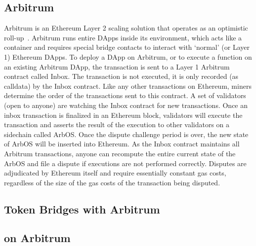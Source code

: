 

\subsection{Arbitrum}

Arbitrum is an Ethereum Layer 2 scaling solution that operates as an optimistic roll-up~\cite{kalodner2018arbitrum}. Arbitrum runs entire DApps inside its environment, which acts like a container and requires special bridge contacts to interact with `normal' (or Layer 1) Ethereum DApps. To deploy a DApp on Arbitrum, or to execute a function on an existing Arbitrum DApp, the transaction is sent to a Layer 1 Arbitrum contract called Inbox. The transaction is not executed, it is only recorded (as calldata) by the Inbox contract. Like any other transactions on Ethereum, miners determine the order of the transactions sent to this contract. A set of validators (open to anyone) are watching the Inbox contract for new transactions. Once an inbox transaction is finalized in an Ethereum block, validators will execute the transaction and asserts the result of the execution to other validators on a sidechain called ArbOS. Once the dispute challenge period is over, the new state of ArbOS will be inserted into Ethereum. As the Inbox contract maintains all Arbitrum transactions, anyone can recompute the entire current state of the ArbOS and file a dispute if executions are not performed correctly. Disputes are adjudicated by Ethereum itself and require essentially constant gas costs, regardless of the size of the gas costs of the transaction being disputed.  

\subsection{Token Bridges with Arbitrum}


\subsection{\cm on Arbitrum}

